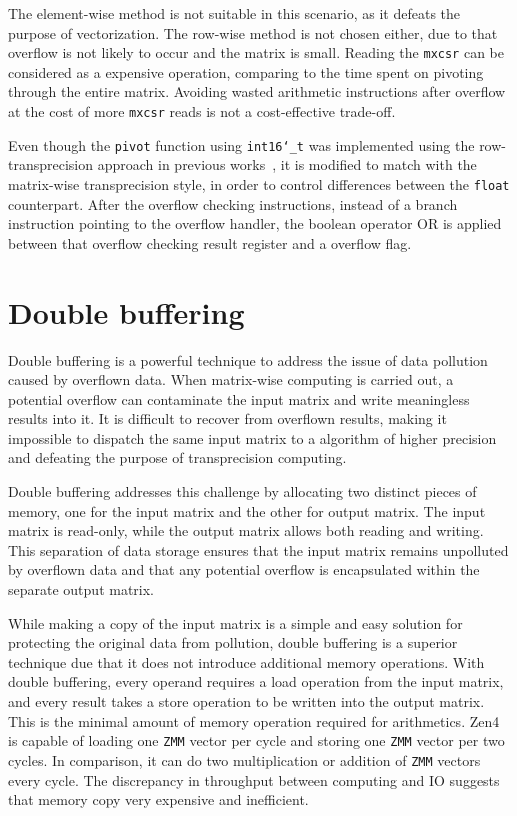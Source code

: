 \documentclass[logo,bsc,singlespacing,parskip]{infthesis}
\newcommand{\dtshort}{\texttt{int16\char`_t}}
\newcommand{\dtfloat}{\texttt{float}}
\newcommand{\mxcsr}{\texttt{mxcsr}}
\newcommand{\pivot}{\texttt{pivot}}
\newcommand{\zmm}{\texttt{ZMM}}
\begin{document}
The element-wise method is not suitable in this scenario, as it defeats the
purpose of vectorization. The row-wise method is not chosen either, due to that
overflow is not likely to occur and the matrix is small. Reading the \mxcsr{}
can be considered as a expensive operation, comparing to the time spent on
pivoting through the entire matrix. Avoiding wasted arithmetic instructions
after overflow at the cost of more \mxcsr{} reads is not a cost-effective
trade-off.

Even though the \pivot{} function using \dtshort{} was implemented using the
row-transprecision approach in previous works~\cite{FPL2}, it is modified to
match with the matrix-wise transprecision style, in order to control differences
between the \dtfloat{} counterpart. After the overflow checking instructions,
instead of a branch instruction pointing to the overflow handler, the boolean
operator OR is applied between that overflow checking result register and a
overflow flag. 


\section{Double buffering}

Double buffering is a powerful technique to address the issue of data pollution
caused by overflown data. When matrix-wise computing is carried out, a potential
overflow can contaminate the input matrix and write meaningless results into it.
It is difficult to recover from overflown results, making it impossible to
dispatch the same input matrix to a algorithm of higher precision and defeating
the purpose of transprecision computing.

Double buffering addresses this challenge by allocating two distinct pieces of
memory, one for the input matrix and the other for output matrix. The input
matrix is read-only, while the output matrix allows both reading and writing.
This separation of data storage ensures that the input matrix remains unpolluted
by overflown data and that any potential overflow is encapsulated within the
separate output matrix. 

While making a copy of the input matrix is a simple and easy solution for
protecting the original data from pollution, double buffering is a superior
technique due that it does not introduce additional memory operations. With
double buffering, every operand requires a load operation from the input matrix,
and every result takes a store operation to be written into the output matrix.
This is the minimal amount of memory operation required for arithmetics. Zen4 is
capable of loading one \zmm{} vector per cycle and storing one \zmm{} vector per two
cycles. In comparison, it can do two multiplication or addition of \zmm{}
vectors every cycle. The discrepancy in throughput between computing and IO
suggests that memory copy very expensive and inefficient. 
\end{document}

